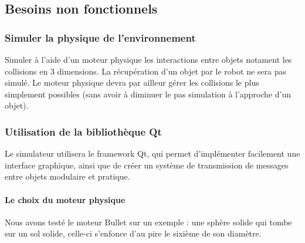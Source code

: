 \subsection{Besoins non fonctionnels}

\subsubsection{Simuler la physique de l'environnement}

Simuler à l'aide d'un moteur physique les interactions entre objets notament les collisions en 3 dimensions. La récupération d'un objet par le robot ne sera pas simulé. Le moteur physique devra par ailleur gérer les collisions le plus simplement possibles (sans avoir à diminuer le pas simulation à l'approche d'un objet).

\subsubsection{Utilisation de la bibliothèque Qt}

Le simulateur utilisera le framework Qt, qui permet d'implémenter facilement une interface graphique, ainsi que de créer un système de transmission de messages entre objets modulaire et pratique. 

\paragraph{Le choix du moteur physique}
Nous avons testé le moteur Bullet sur un exemple : une sphère solide qui tombe sur un sol solide, celle-ci s'enfonce d'au pire le sixième de son diamètre.


